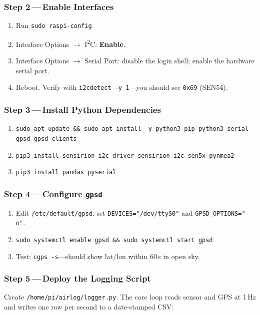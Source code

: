 \documentclass[11pt, letterpaper]{article}
\begin{document}
\subsubsection{Step 2\,---\,Enable Interfaces}
\begin{enumerate}
  \item Run \texttt{sudo raspi-config}
  \item Interface Options $\to$ I\textsuperscript{2}C: \textbf{Enable}.
  \item Interface Options $\to$ Serial Port: disable the login shell; enable the hardware serial port.
  \item Reboot. Verify with \texttt{i2cdetect -y 1}---you should see \texttt{0x69} (SEN54).
\end{enumerate}

\subsubsection{Step 3\,---\,Install Python Dependencies}
\begin{enumerate}
  \item \texttt{sudo apt update \&\& sudo apt install -y python3-pip python3-serial gpsd gpsd-clients}
  \item \texttt{pip3 install sensirion-i2c-driver sensirion-i2c-sen5x pynmea2}
  \item \texttt{pip3 install pandas pyserial}
\end{enumerate}

\subsubsection{Step 4\,---\,Configure \texttt{gpsd}}
\begin{enumerate}
  \item Edit \texttt{/etc/default/gpsd}: set \texttt{DEVICES="/dev/ttyS0"} and \texttt{GPSD\_OPTIONS="-n"}.
  \item \texttt{sudo systemctl enable gpsd \&\& sudo systemctl start gpsd}
  \item Test: \texttt{cgps -s}---should show lat/lon within 60\,s in open sky.
\end{enumerate}

\subsubsection{Step 5\,---\,Deploy the Logging Script}

Create \texttt{/home/pi/airlog/logger.py}. The core loop reads sensor and GPS at 1\,Hz and
writes one row per second to a date-stamped CSV:
\end{document}
